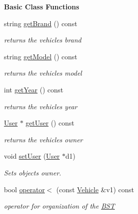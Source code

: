 \begin{Indent}\textbf{ Basic Class Functions}\par
\begin{DoxyCompactItemize}
\item 
string \hyperlink{group___vehicle_ga6d5f105e83177b3738a639e4e613218f}{get\+Brand} () const
\begin{DoxyCompactList}\small\item\em returns the vehicle\textquotesingle{}s brand \end{DoxyCompactList}\item 
string \hyperlink{group___vehicle_ga42379788d946d27ab81851461cb56a49}{get\+Model} () const
\begin{DoxyCompactList}\small\item\em returns the vehicle\textquotesingle{}s model \end{DoxyCompactList}\item 
int \hyperlink{group___vehicle_gaa3933383210a75d4c37b66d918ab1526}{get\+Year} () const
\begin{DoxyCompactList}\small\item\em returns the vehicle\textquotesingle{}s year \end{DoxyCompactList}\item 
\hyperlink{class_user}{User} $\ast$ \hyperlink{group___vehicle_ga8ca5c5a020a718d9c320bd4b5c034cfe}{get\+User} () const
\begin{DoxyCompactList}\small\item\em returns the vehicle\textquotesingle{}s owner \end{DoxyCompactList}\item 
void \hyperlink{group___vehicle_gaeea0b2b24f03a98cc6d1c5ad1c9ece73}{set\+User} (\hyperlink{class_user}{User} $\ast$d1)
\begin{DoxyCompactList}\small\item\em Sets object\textquotesingle{}s owner. \end{DoxyCompactList}\item 
bool \hyperlink{group___vehicle_ga3e144f33207edd2cdbabcbefea1f3269}{operator$<$} (const \hyperlink{class_vehicle}{Vehicle} \&v1) const
\begin{DoxyCompactList}\small\item\em operator for organization of the \hyperlink{class_b_s_t}{B\+ST} \end{DoxyCompactList}\end{DoxyCompactItemize}
\end{Indent}
